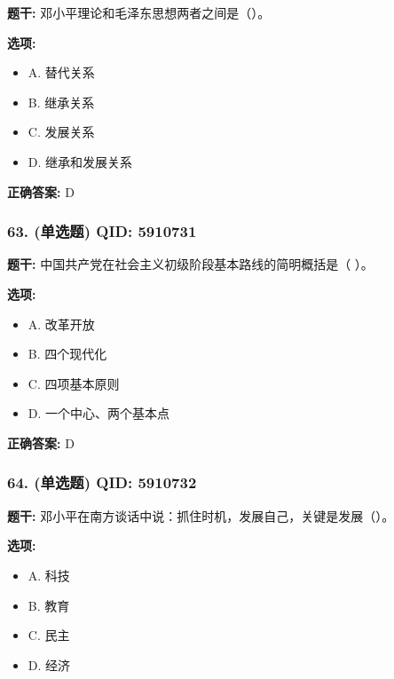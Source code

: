 \documentclass[12pt,UTF8]{ctexart}
\begin{document}
\textbf{题干:}
邓小平理论和毛泽东思想两者之间是（）。

\textbf{选项:}
\begin{itemize}[leftmargin=*]

  \item A. 替代关系

  \item B. 继承关系

  \item C. 发展关系

  \item D. 继承和发展关系

\end{itemize}

\textbf{正确答案:}
D

\vspace{0.3em}\hrulefill\vspace{0.7em}

\subsubsection*{63. (单选题) \small QID: 5910731}

\textbf{题干:}
中国共产党在社会主义初级阶段基本路线的简明概括是（ ）。

\textbf{选项:}
\begin{itemize}[leftmargin=*]

  \item A. 改革开放

  \item B. 四个现代化

  \item C. 四项基本原则

  \item D. 一个中心、两个基本点

\end{itemize}

\textbf{正确答案:}
D

\vspace{0.3em}\hrulefill\vspace{0.7em}

\subsubsection*{64. (单选题) \small QID: 5910732}

\textbf{题干:}
邓小平在南方谈话中说：抓住时机，发展自己，关键是发展（）。

\textbf{选项:}
\begin{itemize}[leftmargin=*]

  \item A. 科技

  \item B. 教育

  \item C. 民主

  \item D. 经济

\end{itemize}
\end{document}
